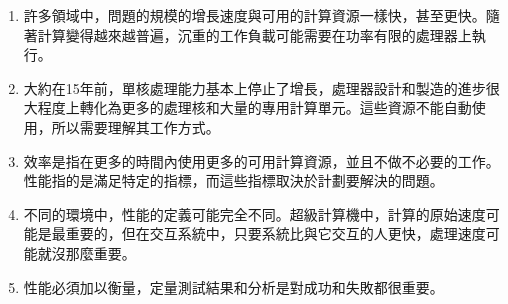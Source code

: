 \begin{enumerate}
\item 
許多領域中，問題的規模的增長速度與可用的計算資源一樣快，甚至更快。隨著計算變得越來越普遍，沉重的工作負載可能需要在功率有限的處理器上執行。

\item 
大約在15年前，單核處理能力基本上停止了增長，處理器設計和製造的進步很大程度上轉化為更多的處理核和大量的專用計算單元。這些資源不能自動使用，所以需要理解其工作方式。

\item 
效率是指在更多的時間內使用更多的可用計算資源，並且不做不必要的工作。性能指的是滿足特定的指標，而這些指標取決於計劃要解決的問題。

\item
不同的環境中，性能的定義可能完全不同。超級計算機中，計算的原始速度可能是最重要的，但在交互系統中，只要系統比與它交互的人更快，處理速度可能就沒那麼重要。

\item
性能必須加以衡量，定量測試結果和分析是對成功和失敗都很重要。
	
\end{enumerate}